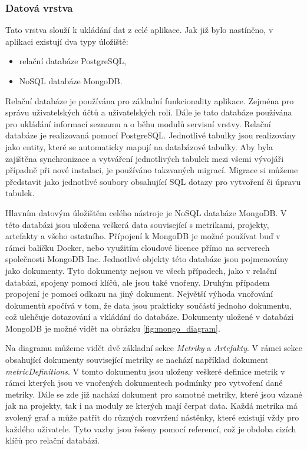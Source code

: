 \documentclass[czech,master,public,dept460,male,cpdeclaration,oneside]{diploma}
\begin{document}
\subsubsection{Datová vrstva}
Tato vrstva slouží k ukládání dat z celé aplikace. Jak již bylo nastíněno, v aplikaci existují dva typy úložiště:

\begin{itemize}
\item relační databáze PostgreSQL,
\item NoSQL databáze MongoDB.
\end{itemize}

Relační databáze je používána pro základní funkcionality aplikace. Zejména pro správu uživatelských účtů a uživatelských rolí. Dále je tato databáze používána pro ukládání informací seznamu a o běhu modulů servisní vrstvy. Relační databáze je realizovaná pomocí PostgreSQL. Jednotlivé tabulky jsou realizovány jako entity, které se automaticky mapují na databázové tabulky. Aby byla zajištěna synchronizace a vytváření jednotlivých tabulek mezi všemi vývojáři případně při nové instalaci, je používáno takzvaných migrací. Migrace si můžeme představit jako jednotlivé soubory obsahující SQL dotazy pro vytvoření či úpravu tabulek.

Hlavním datovým úložištěm celého nástroje je NoSQL databáze MongoDB. V této databázi jsou uložena veškerá data související s metrikami, projekty, artefakty a všeho ostatního. Přípojení k MongoDB je možné používat buď v rámci balíčku Docker, nebo využitím cloudové licence přímo na serverech společnosti MongoDB Inc. Jednotlivé objekty této databáze jsou pojmenovány jako dokumenty. Tyto dokumenty nejsou ve všech případech, jako v relační databázi, spojeny pomocí klíčů, ale jsou také vnořeny. Druhým případem propojení je pomocí odkazu na jiný dokument. Největší výhoda vnořování dokumentů spočívá v tom, že data jsou prakticky součástí jednoho dokumentu, což ulehčuje dotazování a vkládání do databáze. Dokumenty uložené v databázi MongoDB je možné vidět na obrázku \ref{fig:mongo_diagram}.

Na diagramu můžeme vidět dvě základní sekce \textit{Metriky} a \textit{Artefakty}. V rámci sekce obsahující dokumenty související metriky se nachází například dokument \textit{metricDefinitions}. V tomto dokumentu jsou uloženy veškeré definice metrik v rámci kterých jsou ve vnořených dokumentech podmínky pro vytvoření dané metriky. Dále se zde již nachází dokument pro samotné metriky, které jsou vázané jak na projekty, tak i na moduly ze kterých mají čerpat data. Každá metrika má zvolený graf a může patřit do různých rozvržení nástěnky, které existují vždy pro každého uživatele. Tyto vazby jsou řešeny pomocí  referencí, což je obdoba cizích klíčů pro relační databázi.
\end{document}
